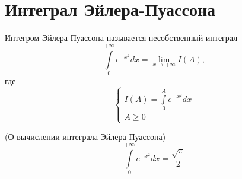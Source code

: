 \documentclass[../../main.tex]{subfiles}
\begin{document}
\section{Интеграл Эйлера-Пуассона}
	\begin{defn}
		Интегром Эйлера-Пуассона называется несобственный интеграл 
		\begin{equation}
		 	\label{lec17:1}
            \int\limits_0^{+\infty}e^{-x^2}dx = \lim\limits_{x\to +\infty} I(A),
		\end{equation}
        где
		\begin{equation}
		 	\label{lec17:2}
            \begin{cases}
                I(A) = \int\limits_0^{A}e^{-x^2}dx \\
                A \geq 0
            \end{cases}
		\end{equation}
        \end{defn}
		
		\begin{theorem}
		 (О вычислении интеграла Эйлера-Пуассона)
		 \begin{equation}
          \label{lec17:3}
		  \int\limits_0^{+\infty}e^{-x^2}dx = \frac{\sqrt{\pi}}{2}
		 \end{equation}

		\end{theorem}
		
\end{document}
